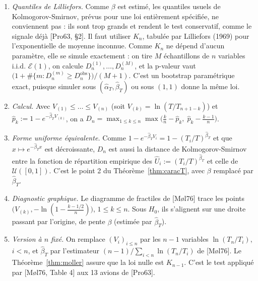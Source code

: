 \begin{remarque}\label{rem:miseenoeuvre}
\begin{enumerate}
\item \emph{Quantiles de Lilliefors.} Comme $\beta$ est estimé, les quantiles usuels de Kolmogorov-Smirnov, prévus pour une loi entièrement spécifiée, ne conviennent pas : ils sont trop grands et rendent le test conservatif, comme le signale déjà [Pro63, §2]. Il faut utiliser $K_n$, tabulée par Lilliefors (1969) pour l'exponentielle de moyenne inconnue. Comme $K_n$ ne dépend d'aucun paramètre, elle se simule exactement : on tire $M$ échantillons de $n$ variables i.i.d. $\mathcal{E}(1)$, on calcule $D_n^{(1)},\dots,D_n^{(M)}$, et la p-valeur vaut $\big(1+\#\{m:D_n^{(m)}\ge D_n^{\mathrm{obs}}\}\big)/(M+1)$. C'est un bootstrap paramétrique exact, puisque simuler sous $(\hat\alpha_T,\hat\beta_T)$ ou sous $(1,1)$ donne la même loi.
\item \emph{Calcul.} Avec $V_{(1)}\le\dots\le V_{(n)}$ (soit $V_{(k)}=\ln(T/T_{n+1-k})$) et $\hat p_k:=1-e^{-\hat\beta_TV_{(k)}}$, on a $D_n=\max_{1\le k\le n}\max\big(\frac kn-\hat p_k,\;\hat p_k-\frac{k-1}{n}\big)$.
\item \emph{Forme uniforme équivalente.} Comme $1-e^{-\hat\beta_TV_i}=1-(T_i/T)^{\hat\beta_T}$ et que $x\mapsto e^{-\hat\beta_Tx}$ est décroissante, $D_n$ est aussi la distance de Kolmogorov-Smirnov entre la fonction de répartition empirique des $\hat U_i:=(T_i/T)^{\hat\beta_T}$ et celle de $\mathcal{U}([0,1])$. C'est le point 2 du Théorème~\ref{thm:caracT}, avec $\beta$ remplacé par $\hat\beta_T$.
\item \emph{Diagnostic graphique.} Le diagramme de fractiles de [Møl76] trace les points $\big(V_{(k)},-\ln(1-\frac{k-1/2}{n})\big)$, $1\le k\le n$. Sous $H_0$, ils s'alignent sur une droite passant par l'origine, de pente $\beta$ (estimée par $\hat\beta_T$).
\item \emph{Version à $n$ fixé.} On remplace $(V_i)_{i\le n}$ par les $n-1$ variables $\ln(T_n/T_i)$, $i<n$, et $\hat\beta_T$ par l'estimateur $(n-1)/\sum_{i<n}\ln(T_n/T_i)$ de [Møl76]. Le Théorème~\ref{thm:moller} assure que la loi nulle est $K_{n-1}$. C'est le test appliqué par [Møl76, Table 4] aux 13 avions de [Pro63].
\end{enumerate}
\end{remarque}

